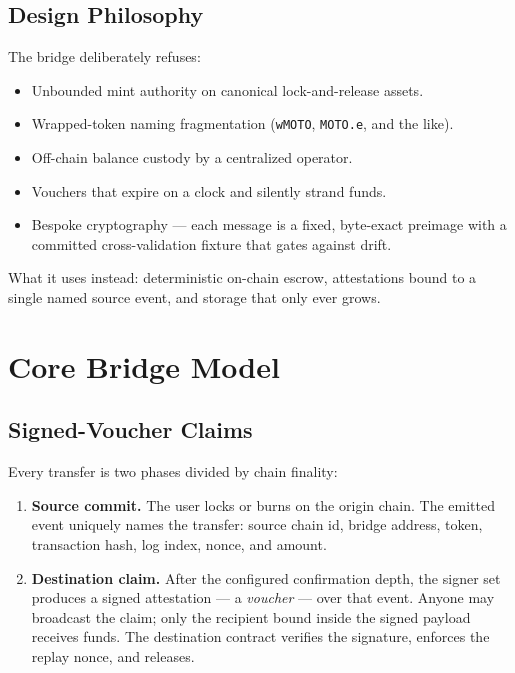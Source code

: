 \documentclass[11pt,a4paper]{article}
\begin{document}
\subsection{Design Philosophy}

The bridge deliberately refuses:

\begin{itemize}
  \item Unbounded mint authority on canonical lock-and-release assets.
  \item Wrapped-token naming fragmentation (\texttt{wMOTO}, \texttt{MOTO.e}, and the like).
  \item Off-chain balance custody by a centralized operator.
  \item Vouchers that expire on a clock and silently strand funds.
  \item Bespoke cryptography --- each message is a fixed, byte-exact preimage with a committed cross-validation fixture that gates against drift.
\end{itemize}

What it uses instead: deterministic on-chain escrow, attestations bound to a single named source event, and storage that only ever grows.

\section{Core Bridge Model}

\subsection{Signed-Voucher Claims}

Every transfer is two phases divided by chain finality:

\begin{enumerate}
  \item \textbf{Source commit.} The user locks or burns on the origin chain. The emitted event uniquely names the transfer: source chain id, bridge address, token, transaction hash, log index, nonce, and amount.
  \item \textbf{Destination claim.} After the configured confirmation depth, the signer set produces a signed attestation --- a \emph{voucher} --- over that event. Anyone may broadcast the claim; only the recipient bound inside the signed payload receives funds. The destination contract verifies the signature, enforces the replay nonce, and releases.
\end{enumerate}
\end{document}
